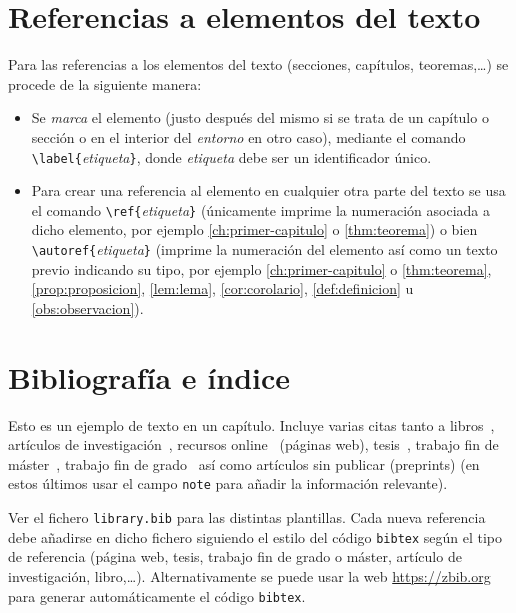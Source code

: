 \section{Referencias a elementos del texto}\label{sec:referencias}

Para las referencias a los elementos del texto (secciones, capítulos, teoremas,\ldots) se procede de la siguiente manera:
\begin{itemize}
    \item Se \emph{marca} el elemento (justo después del mismo si se trata de un capítulo o sección o en el interior del \emph{entorno} en otro caso), mediante el comando \verb+\label{+\emph{etiqueta}\verb+}+, donde \emph{etiqueta} debe ser un identificador único.
    \item Para crear una referencia al elemento en cualquier otra parte del texto se usa el comando \verb+\ref{+\emph{etiqueta}\verb+}+ (únicamente imprime la numeración asociada a dicho elemento, por ejemplo \ref{ch:primer-capitulo} o \ref{thm:teorema}) o bien \verb+\autoref{+\emph{etiqueta}\verb+}+ (imprime la numeración del elemento así como un texto previo indicando su tipo, por ejemplo \autoref{ch:primer-capitulo} o \autoref{thm:teorema}, \autoref{prop:proposicion}, \autoref{lem:lema}, \autoref{cor:corolario}, \autoref{def:definicion} u \autoref{obs:observacion}).
\end{itemize}

\section{Bibliografía e índice}

Esto es un ejemplo de texto en un capítulo. Incluye varias citas tanto a libros~\cite{Aigner2018}, artículos de investigación~\cite{Euler1985}, recursos online~\cite{EulerWiki} (páginas web), tesis~\cite{CitekeyPhdthesis}, trabajo fin de máster~\cite{CitekeyMastersthesis}, trabajo fin de grado~\cite{CiteKeyBachelorsthesis} así como artículos sin publicar (preprints) \cite{castroinfantes2022conjugate} (en estos últimos usar el campo \texttt{note} para añadir la información relevante).

Ver el fichero \texttt{library.bib} para las distintas plantillas. Cada nueva referencia debe añadirse en dicho fichero siguiendo el estilo del código \texttt{bibtex} según el tipo de referencia (página web, tesis, trabajo fin de grado o máster, artículo de investigación, libro,\ldots). Alternativamente se puede usar la web \href{https://zbib.org}{https://zbib.org} para generar automáticamente el código \texttt{bibtex}.

\endinput

